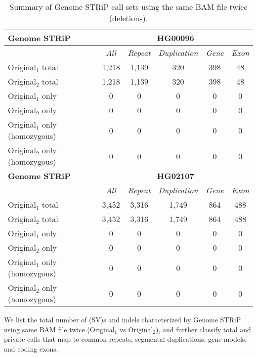 \begin{table}[htb]
\caption{ Summary of Genome STRiP call sets using the same BAM file twice (deletions). }
\begin{center}
\begin{tabular}{|l|c||c|c|c|c|}
\hline
{\bf Genome STRiP} & \multicolumn{5}{|c|}{\bf HG00096} \\
\hline
\cline{2-6}
{\bf} & {\it All} & {\it Repeat} & {\it Duplication} & {\it Gene} & {\it Exon} \\
\hline
Original$_1$ total & 1,218 & 1,139 & 320 & 398 & 48 \\
\hline
Original$_2$ total & 1,218 & 1,139 & 320 & 398 & 48 \\
\hline
Original$_1$ only & 0 & 0 & 0 & 0 & 0\\ 
\hline
Original$_2$ only & 0 & 0 & 0 & 0 & 0\\
\hline
Original$_1$ only (homozygous) & 0 & 0 & 0 & 0 & 0\\ 
\hline
Original$_2$ only (homozygous) & 0 & 0 & 0 & 0 & 0\\  
\hline
\hline
{\bf Genome STRiP} & \multicolumn{5}{|c|}{\bf HG02107} \\
\hline
\cline{2-6}
{\bf} & {\it All} & {\it Repeat} & {\it Duplication} & {\it Gene} & {\it Exon} \\
\hline
Original$_1$ total & 3,452 & 3,316 & 1,749 & 864 & 488 \\
\hline
Original$_2$ total & 3,452 & 3,316 & 1,749 & 864 & 488 \\
\hline
Original$_1$ only & 0 & 0 & 0 & 0 & 0\\ 
\hline
Original$_2$ only & 0 & 0 & 0 & 0 & 0\\
\hline
Original$_1$ only (homozygous) & 0 & 0 & 0 & 0 & 0\\ 
\hline
Original$_2$ only (homozygous) & 0 & 0 & 0 & 0 & 0\\  
\hline
\end{tabular}
\end{center}
{\footnotesize We list the total number of (SV)s and indels characterized by Genome STRiP using same BAM file twice (Original$_1$ vs Original$_2$), 
and further classify total and private calls that map to common repeats, segmental duplications, gene models, and coding exons.}
\label{supptab:orig-vs-orig2-svtoolkit}
\end{table}

